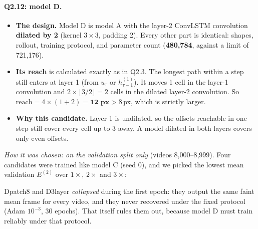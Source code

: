 \documentclass[11pt,a4paper]{article}
\begin{document}
\paragraph{Q2.12: model D.}
\begin{itemize}
  \item \textbf{The design.} Model D is model A with the layer-2 ConvLSTM
        convolution \textbf{dilated by 2} (kernel $3\times3$, padding 2). Every
        other part is identical: shapes, rollout, training protocol, and
        parameter count (\textbf{480,784}, against a limit of 721,176).
  \item \textbf{Its reach} is calculated exactly as in Q2.3. The longest path
        within a step still enters at layer 1 (from $u_\tau$ or
        $h^{(1)}_{\tau-1}$). It moves 1 cell in the layer-1 convolution and
        $2\times\lfloor 3/2\rfloor=2$ cells in the dilated layer-2 convolution.
        So $\text{reach}=4\times(1+2)=\textbf{12 px}>8$\,px, which is strictly
        larger.
  \item \textbf{Why this candidate.} Layer 1 is undilated, so the offsets
        reachable in one step still cover every cell up to 3 away. A model
        dilated in both layers covers only even offsets.
\end{itemize}
\emph{How it was chosen: on the validation split only} (videos 8,000--8,999).
Four candidates were trained like model C (seed 0), and we picked the lowest
mean validation $E^{(2)}$ over $1\times$, $2\times$ and $3\times$:

\begin{center}\footnotesize
{}
\end{center}
\noindent Dpatch8 and D3layer \emph{collapsed} during the first epoch: they
output the same faint mean frame for every video, and they never recovered
under the fixed protocol (Adam $10^{-3}$, 30 epochs). That itself rules them
out, because model D must train reliably under that protocol.
\end{document}

